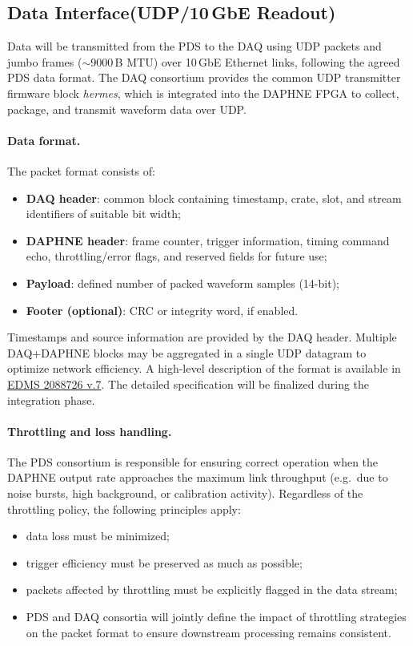 \subsection{Data Interface(UDP/10\,GbE Readout)}

\label{sec:protocol-data}

Data will be transmitted from the PDS to the DAQ using UDP packets and jumbo frames
(\(\sim\)9000\,B MTU) over 10\,GbE Ethernet links, following the agreed PDS data format.
The DAQ consortium provides the common UDP transmitter firmware block \textit{hermes}, which is integrated into the DAPHNE FPGA to collect, package,
and transmit waveform data over UDP.

\paragraph{Data format.}
The packet format consists of:
\begin{itemize}[nosep]
  \item \textbf{DAQ header}: common block containing timestamp, crate, slot, and stream
        identifiers of suitable bit width;
  \item \textbf{DAPHNE header}: frame counter, trigger information, timing command echo,
        throttling/error flags, and reserved fields for future use;
  \item \textbf{Payload}: defined number of packed waveform samples (14-bit);
  \item \textbf{Footer (optional)}: CRC or integrity word, if enabled.
\end{itemize}

Timestamps and source information are provided by the DAQ header. Multiple
DAQ+DAPHNE blocks may be aggregated in a single UDP datagram to optimize network
efficiency. A high-level description of the format is available in \href{https://edms.cern.ch/file/2088726/7/DAPHNE-DAQ_Format_Ethernet_25_09_25.xlsx}{EDMS 2088726 v.7}. The detailed specification will be finalized during the integration
phase. 


\paragraph{Throttling and loss handling.}
The PDS consortium is responsible for ensuring correct operation when the DAPHNE output rate approaches the maximum link throughput (e.g.\ due to noise bursts, high background,
or calibration activity). Regardless of the throttling policy, the following principles apply:
\begin{itemize}[nosep]
  \item data loss must be minimized;
  \item trigger efficiency must be preserved as much as possible;
  \item packets affected by throttling must be explicitly flagged in the data stream;
  \item PDS and DAQ consortia will jointly define the impact of throttling strategies on
        the packet format to ensure downstream processing remains consistent.
\end{itemize}

